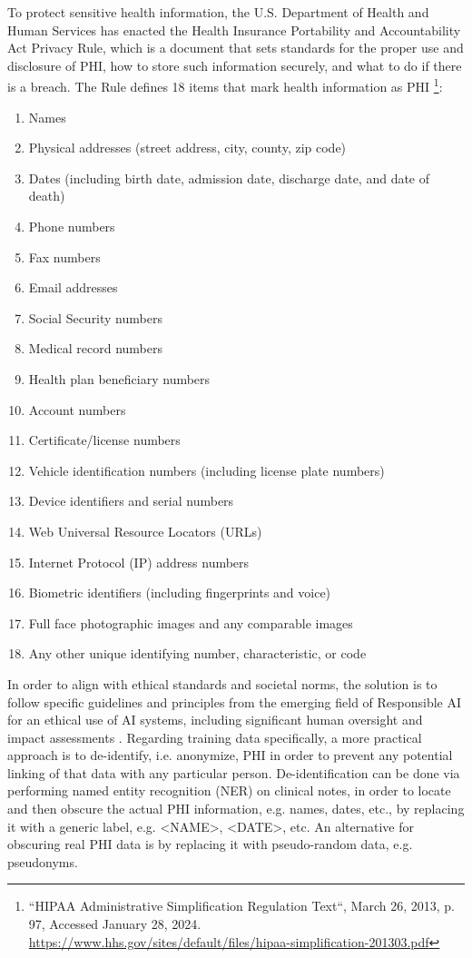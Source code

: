 To protect sensitive health information, the U.S. Department of Health and Human Services has enacted the Health Insurance Portability and Accountability Act Privacy Rule, which is a document that sets standards for the proper use and disclosure of PHI, how to store such information securely, and what to do if there is a breach. The Rule defines 18 items that mark health information as PHI \footnote{``HIPAA Administrative Simplification Regulation Text``, March 26, 2013, p. 97, Accessed January 28, 2024. \url{https://www.hhs.gov/sites/default/files/hipaa-simplification-201303.pdf}}:
\begin{enumerate}
    \item Names
    \item Physical addresses (street address, city, county, zip code)
    \item Dates (including birth date, admission date, discharge date, and date of death)
    \item Phone numbers
    \item Fax numbers
    \item Email addresses
    \item Social Security numbers
    \item Medical record numbers
    \item Health plan beneficiary numbers
    \item Account numbers
    \item Certificate/license numbers
    \item Vehicle identification numbers (including license plate numbers)
    \item Device identifiers and serial numbers
    \item Web Universal Resource Locators (URLs)
    \item Internet Protocol (IP) address numbers
    \item Biometric identifiers (including fingerprints and voice)
    \item Full face photographic images and any comparable images
    \item Any other unique identifying number, characteristic, or code
\end{enumerate}

In order to align with ethical standards and societal norms, the solution is to follow specific guidelines and principles from the emerging field of Responsible AI for an ethical use of AI systems, including significant human oversight and impact assessments \cite{opportunitiesrisks2024}. Regarding training data specifically, a more practical approach is to de-identify, i.e. anonymize, PHI in order to prevent any potential linking of that data with any particular person. De-identification can be done via performing named entity recognition (NER) on clinical notes, in order to locate and then obscure the actual PHI information, e.g. names, dates, etc., by replacing it with a generic label, e.g. <NAME>, <DATE>, etc. An alternative for obscuring real PHI data is by replacing it with pseudo-random data, e.g. pseudonyms.

